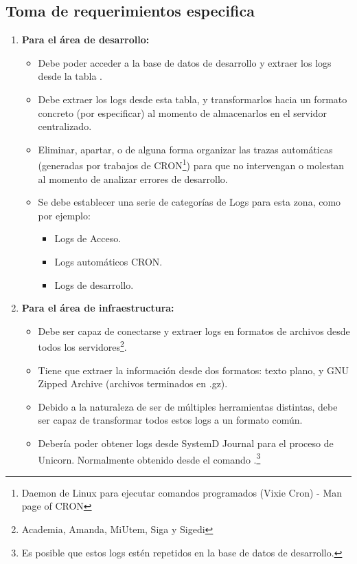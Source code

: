 \subsection{Toma de requerimientos especifica}
\label{anexos:reqs_especificos}

\begin{enumerate}
  \item \textbf{Para el área de desarrollo: }
    \begin{itemize}
      \item Debe poder acceder a la base de datos de desarrollo y extraer los logs desde la tabla .
      \item Debe extraer los logs desde esta tabla, y transformarlos hacia un formato concreto (por especificar) al momento de almacenarlos en el servidor centralizado.
      \item Eliminar, apartar, o de alguna forma organizar las trazas automáticas (generadas por trabajos de CRON\footnote{Daemon de Linux para ejecutar comandos programados (Vixie Cron) - Man page of CRON}) para que no intervengan o molestan al momento de analizar errores de desarrollo.
        \item Se debe establecer una serie de categorías de Logs para esta zona, como por ejemplo:
          \begin{itemize}
            \item Logs de Acceso.
            \item Logs automáticos CRON.
            \item Logs de desarrollo.
          \end{itemize}
    \end{itemize}
    \item \textbf{Para el área de infraestructura: }
      \begin{itemize}
        \item Debe ser capaz de conectarse y extraer logs en formatos de archivos desde todos los servidores\footnote{Academia, Amanda, MiUtem, Siga y Sigedi}.
        \item Tiene que extraer la información desde dos formatos: texto plano, y GNU Zipped Archive (archivos terminados en .gz).
          \item Debido a la naturaleza de ser de múltiples herramientas distintas, debe ser capaz de transformar todos estos logs a un formato común.
          \item Debería poder obtener logs desde SystemD Journal para el proceso de Unicorn. Normalmente obtenido desde el comando .\footnote{Es posible que estos logs estén repetidos en la base de datos de desarrollo.}
      \end{itemize}
\end{enumerate}

\clearpage
